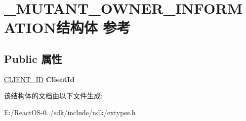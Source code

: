 \hypertarget{struct___m_u_t_a_n_t___o_w_n_e_r___i_n_f_o_r_m_a_t_i_o_n}{}\section{\+\_\+\+M\+U\+T\+A\+N\+T\+\_\+\+O\+W\+N\+E\+R\+\_\+\+I\+N\+F\+O\+R\+M\+A\+T\+I\+O\+N结构体 参考}
\label{struct___m_u_t_a_n_t___o_w_n_e_r___i_n_f_o_r_m_a_t_i_o_n}
\subsection*{Public 属性}
\begin{DoxyCompactItemize}
\item 
\mbox{\label{struct___m_u_t_a_n_t___o_w_n_e_r___i_n_f_o_r_m_a_t_i_o_n_a67a425fe0ecade8cdb69bffd7552dacc}} 
\hyperlink{struct___c_l_i_e_n_t___i_d}{C\+L\+I\+E\+N\+T\+\_\+\+ID} {\bfseries Client\+Id}
\end{DoxyCompactItemize}


该结构体的文档由以下文件生成\+:\begin{DoxyCompactItemize}
\item 
E\+:/\+React\+O\+S-\/0../sdk/include/ndk/extypes.\+h\end{DoxyCompactItemize}
